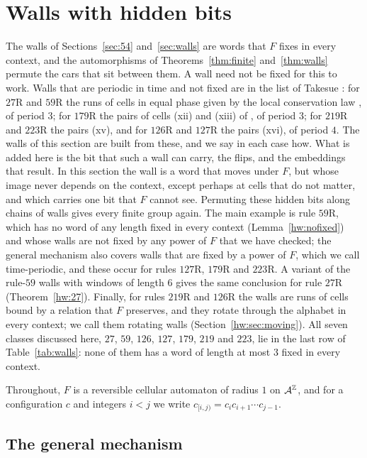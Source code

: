 
\section{Walls with hidden bits}\label{sec:hidden}

The walls of Sections~\ref{sec:54} and~\ref{sec:walls} are words that $F$ fixes in every context, and the automorphisms of Theorems~\ref{thm:finite} and~\ref{thm:walls} permute the cars that sit between them. A wall need not be fixed for this to work. Walls that are periodic in time and not fixed are in the list of Takesue \cite[Section~4]{Takesue1989}: for $27$R and $59$R the runs of cells in equal phase given by the local conservation law \cite[(4.1)--(4.3)]{Takesue1989}, of period $3$; for $179$R the pairs of cells (xii) and (xiii) of \cite[Fig.~2, Table~III]{Takesue1989}, of period $3$; for $219$R and $223$R the pairs (xv), and for $126$R and $127$R the pairs (xvi), of period $4$. The walls of this section are built from these, and we say in each case how. What is added here is the bit that such a wall can carry, the flips, and the embeddings that result. In this section the wall is a word that moves under $F$, but whose image never depends on the context, except perhaps at cells that do not matter, and which carries one bit that $F$ cannot see. Permuting these hidden bits along chains of walls gives every finite group again. The main example is rule $59$R, which has no word of any length fixed in every context (Lemma~\ref{hw:nofixed}) and whose walls are not fixed by any power of $F$ that we have checked; the general mechanism also covers walls that are fixed by a power of $F$, which we call time-periodic, and these occur for rules $127$R, $179$R and $223$R. A variant of the rule-$59$ walls with windows of length $6$ gives the same conclusion for rule $27$R (Theorem~\ref{hw:27}). Finally, for rules $219$R and $126$R the walls are runs of cells bound by a relation that $F$ preserves, and they rotate through the alphabet in every context; we call them rotating walls (Section~\ref{hw:sec:moving}). All seven classes discussed here, $27$, $59$, $126$, $127$, $179$, $219$ and $223$, lie in the last row of Table~\ref{tab:walls}: none of them has a word of length at most $3$ fixed in every context.

Throughout, $F$ is a reversible cellular automaton of radius $1$ on $\mathcal{A}^{\mathbb{Z}}$, and for a configuration $c$ and integers $i<j$ we write $c_{[i,j)}=c_i c_{i+1}\cdots c_{j-1}$.

\subsection{The general mechanism}\label{hw:sec:general}

